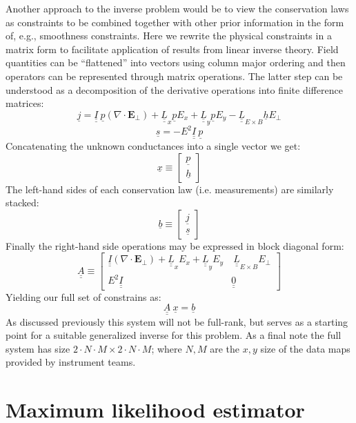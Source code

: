 \documentclass[11pt,letterpaper]{article}
\begin{document}
Another approach to the inverse problem would be to view the conservation laws as constraints to be combined together with other prior information in the form of, e.g., smoothness constraints.  Here we rewrite the physical constraints in a matrix form to facilitate application of results from linear inverse theory.  Field quantities can be ``flattened'' into vectors using column major ordering and then operators can be represented through matrix operations.  The latter step can be understood as a decomposition of the derivative operations into finite difference matrices:
\begin{equation}
\underline{j} = \underline{\underline{I}} ~ \underline{p} \left( \nabla \cdot \mathbf{E}_\perp \right) + \underline{\underline{L}}_x \underline{p} E_x + \underline{\underline{L}}_y \underline{p} E_y - \underline{\underline{L}}_{E \times B} \underline{h} E_\perp
\end{equation}
\begin{equation}
\underline{s} = - E^2 \underline{\underline{I}} ~ \underline{p}
\end{equation}
Concatenating the unknown conductances into a single vector we get:
\begin{equation}
\underline{x} \equiv \left[ \begin{array}{c} \underline{p} \\ \underline{h} \end{array} \right]
\end{equation}
The left-hand sides of each conservation law (i.e. measurements) are similarly stacked:
\begin{equation}
\underline{b} \equiv \left[ \begin{array}{c} \underline{j} \\ \underline{s} \end{array} \right]
\end{equation}
Finally the right-hand side operations may be expressed in block diagonal form:
\begin{equation}
\underline{\underline{A}} \equiv \left[ \begin{array}{cc} \underline{\underline{I}}  \left( \nabla \cdot \mathbf{E}_\perp \right) +  \underline{\underline{L}}_x  E_x + \underline{\underline{L}}_y E_y  & ~ \underline{\underline{L}}_{E \times B} E_\perp \\ E^2 \underline{\underline{I}} & \underline{\underline{0}} \end{array} \right]
\end{equation}
Yielding our full set of constrains as:
\begin{equation}
\underline{\underline{A}} ~ \underline{x} = \underline{b}
\end{equation}
As discussed previously this system will not be full-rank, but serves as a starting point for a suitable generalized inverse for this problem.  As a final note the full system has size $2 \cdot N \cdot M \times 2 \cdot N \cdot M$; where $N,M$ are the $x,y$ size of the data maps provided by instrument teams.  


\section{Maximum likelihood estimator}
\end{document}
